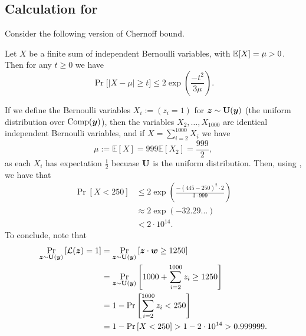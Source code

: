 
\subsection{\texorpdfstring{Calculation for~}{Calculation for Example 1}}
\label{subsec:ex1}
Consider the following version of Chernoff bound.
\begin{lemma}
    Let $X$ be a finite sum of independent Bernoulli variables, with $\mathbb{E}[X] = \mu > 0$. Then for any $t \geq 0$ we have
    \[
    \Pr \Big[ \left|X - \mu\right| \geq t \Big] \leq 2\exp\left(\frac{-t^2}{3 \mu} \right).
    \] 
    
    \label{lemma:chernoff}  
    \end{lemma}
If we define the Bernoulli variables $X_i := (z_i = 1)$ for ${\bm{z}} \sim \mathbf{U}({\bm{y}})$ (the uniform distribution over $\operatorname{Comp}({\bm{y}})$), then the variables $X_2, \ldots, X_{1000}$ are identical independent Bernoulli variables, and if $X = \sum_{i = 2}^{1000} X_i$ we have 
\[
    \mu := \mathbb{E}[X] =  999\mathbb{E}[X_2] = \frac{999}{2},
\]
as each $X_i$ has expectation $\frac{1}{2}$ becuase $\mathbf{U}$ is the uniform distribution. Then, using , we have that 
\begin{align*}
    \Pr\left[ X < 250 \right] &\leq 2 \exp\left(\frac{-(445-250)^2    \cdot 2}{3 \cdot 999}\right)\\ &\approx 2 \exp(-32.29...)\\ &< 2 \cdot 10^{14}.
\end{align*}
To conclude, note that
\begin{align*}
    \Pr_{{\bm{z}} \sim \mathbf{U}({\bm{y}})}
     \left[\mathcal{L}({\bm{z}}) = 1 \right] 
      &= \Pr_{{\bm{z}} \sim \mathbf{U}({\bm{y}})}
    \left[{\bm{z}} \cdot {\bm{w}} \geq 1250 \right]\\
    &= \Pr_{{\bm{z}} \sim \mathbf{U}({\bm{y}})}\left[1000 + \sum_{i=2}^{1000}{z_i} \geq 1250\right]\\
    &= 1 - \Pr\left[\sum_{i=2}^{1000}{z_i} < 250\right]\\
    &= 1 - \Pr\left[ X < 250 \right] > 1 - 2\cdot 10^{14} > 0.999999.
\end{align*}
    
\subsection{\texorpdfstring{}{Proposition 1}}

